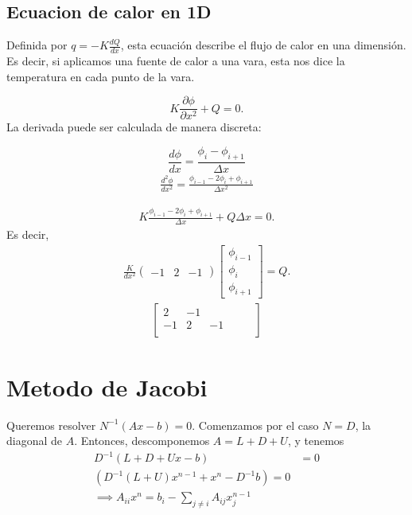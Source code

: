 \documentclass{article}
\theoremstyle{problemstyle}
\begin{document}
  \subsection{Ecuacion de calor en 1D}
  Definida por $ q = -K \frac{dQ}{dx} $, esta ecuaci\'on describe el flujo de calor en una dimensi\'on. Es decir, si aplicamos una fuente de calor a una vara, esta nos dice la temperatura en cada punto de la vara.
  
  \[
    K \frac{\partial \phi}{\partial x^2} + Q = 0.
  \]
  La derivada puede ser calculada de manera discreta:

  \[
    \frac{d\phi}{dx} = \frac{\phi_i-\phi_{i+1}}{\Delta x}
  \]
  \begin{align*}
    \frac{d^2\phi}{dx^2} = \frac{\phi_{i-1}-2\phi_{i}+\phi_{i+1}}{\Delta x^2}
  \end{align*}

  
  \begin{align*}
    K\frac{\phi_{i-1}-2\phi_{i}+\phi_{i+1}}{\Delta x} +Q\Delta x = 0.
  \end{align*}
  Es decir, 
  \begin{align*}
    \frac{K}{dx^2}\begin{pmatrix}
      -1 & 2 & -1
    \end{pmatrix}\begin{bmatrix}
    \phi_{i-1}\\
    \phi_{i}\\
    \phi_{i+1}
    \end{bmatrix} = Q.
  \end{align*}
   \begin{align*}
    \begin{bmatrix}
      2 & -1 & & & &\\
      -1 & 2 & -1 & & &\\
    \end{bmatrix}
   \end{align*}
  

  \section{Metodo de Jacobi}\label{sec:metodo_de_jacobi} %
  Queremos resolver $ N^{-1}(Ax - b) = 0 $. Comenzamos por el caso $ N = D $, la diagonal de $ A $. Entonces, descomponemos $ A = L + D + U $, y tenemos
  \begin{align*}
    D^{-1} (L+D+U x - b) &= 0\\
    (D^{-1} (L+U) x^{n-1} + x^{n} - D^{-1}b) = 0\\
    \implies A_{ii} x^n = b_i - \sum_{j \neq i} A_{ij}x_j^{n-1}
  \end{align*}
  
\end{document}
